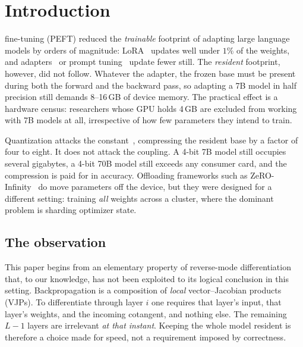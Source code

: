 \documentclass[journal]{IEEEtran}
\begin{document}
\section{Introduction}
\label{sec:intro}

 fine-tuning (PEFT) reduced the \emph{trainable} footprint of
adapting large language models by orders of magnitude: LoRA~\cite{hu2022lora} updates well under
$1\%$ of the weights, and adapters~\cite{houlsby2019adapters} or prompt
tuning~\cite{lester2021prompt} update fewer still. The \emph{resident} footprint, however, did not
follow. Whatever the adapter, the frozen base must be present during both the forward and the
backward pass, so adapting a 7B model in half precision still demands 8--16\,GB of device memory.
The practical effect is a hardware census: researchers whose GPU holds 4\,GB are excluded from
working with 7B models at all, irrespective of how few parameters they intend to train.

Quantization attacks the constant~\cite{dettmers2023qlora,dettmers2022int8}, compressing the
resident base by a factor of four to eight. It does not attack the coupling. A 4-bit 7B model
still occupies several gigabytes, a 4-bit 70B model still exceeds any consumer card, and the
compression is paid for in accuracy. Offloading frameworks such as
ZeRO-Infinity~\cite{rajbhandari2021zeroinfinity} do move parameters off the device, but they were
designed for a different setting: training \emph{all} weights across a cluster, where the dominant
problem is sharding optimizer state.

\subsection{The observation}

This paper begins from an elementary property of reverse-mode differentiation
\cite{griewank2008evaluating,baydin2018autodiff} that, to our knowledge, has not been exploited to
its logical conclusion in this setting. Backpropagation is a composition of \emph{local}
vector--Jacobian products (VJPs). To differentiate through layer $i$ one requires that layer's
input, that layer's weights, and the incoming cotangent, and nothing else. The remaining $L-1$
layers are irrelevant \emph{at that instant}. Keeping the whole model resident is therefore a
choice made for speed, not a requirement imposed by correctness.
\end{document}
